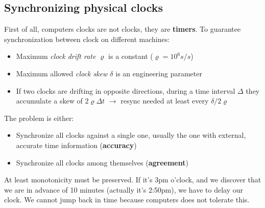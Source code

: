 \documentclass[10pt,a4paper]{article}
\begin{document}
\subsection{Synchronizing physical clocks}
First of all, computers clocks are not clocks, they are \textbf{timers}. To guarantee synchronization between clock on different machines: 
\begin{itemize}
	\item Maximum \textit{clock drift rate $\varrho$} is a constant ($\varrho=10^6 s/s$)
	\item Maximum allowed \textit{clock skew $\delta$} is an engineering parameter
	\item If two clocks are drifting in opposite directions, during a time interval $\Delta$ they accumulate a skew of $2 \varrho \Delta t$ $\rightarrow$ resync needed at least every $\delta / 2 \varrho$
\end{itemize}
The problem is either:
\begin{itemize}
	\item Synchronize all clocks against a single one, usually the one with external, accurate time information (\textbf{accuracy})
	\item Synchronize all clocks among themselves (\textbf{agreement})
\end{itemize}
At least monotonicity must be preserved. If it's 3pm o'clock, and we discover that we are in advance of 10 minutes (actually it's 2:50pm), we have to delay our clock. We cannot jump back in time because computers does not tolerate this.
\end{document}
